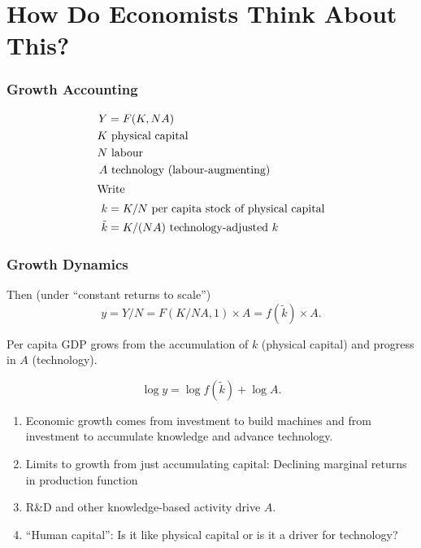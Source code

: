 \section{How Do Economists Think About This?}
\begin{frame}\frametitle{Growth Accounting}

\begin{align*}
 Y &= F(K, NA) \\
 K &\text{ physical capital}\\
 N &\text{ labour}\\
 A &\text{ technology (labour-augmenting)}\\
\intertext{Write}
 k &= K/N~\text{per capita stock of physical capital}\\
 \tilde{k}&=K/(NA)~\text{technology-adjusted $k$}
\end{align*}
\end{frame}
\begin{frame}\frametitle{Growth Dynamics}

Then (under ``constant returns to scale'')
\begin{equation*}
 y = Y/N = F(K/NA, 1) \times A = f(\widetilde{k}) \times A . 
\end{equation*}

Per capita GDP grows from the accumulation of $k$ (physical capital)
and progress in $A$ (technology).

\begin{equation*}
 \log y = \log f(\widetilde{k}) + \log A . 
\end{equation*}

\begin{enumerate}
 \item{Economic growth comes from investment to build machines and
 from investment to accumulate knowledge and advance technology.}
 \item{Limits to growth from just accumulating capital:  Declining
 marginal returns in production function}
 \item{R\&D and other knowledge-based activity drive $A$.}
 \item{``Human capital'':  Is it like physical capital or is it a
 driver for technology?}
\end{enumerate}

\end{frame}

